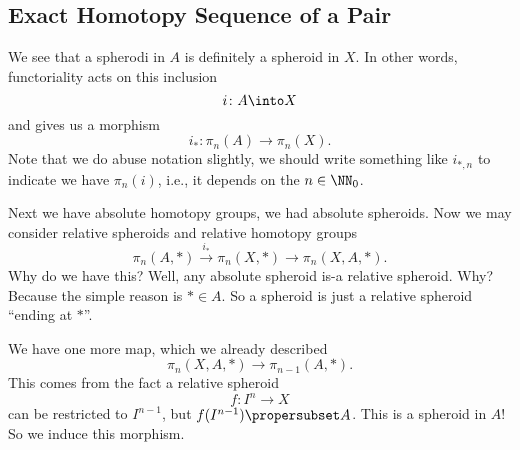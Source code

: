 \subsection{Exact Homotopy Sequence of a Pair}

We see that a spherodi in $A$ is definitely a spheroid in $X$. In
other words, functoriality acts on this inclusion
\begin{equation}
i\colon A\into X
\end{equation}
and gives us a morphism
\begin{equation}
i_{*}\colon\pi_{n}(A)\to\pi_{n}(X).
\end{equation}
Note that we do abuse notation slightly, we should write
something like $i_{*,n}$ to indicate we have $\pi_{n}(i)$, i.e.,
it depends on the $n\in\NN_{0}$.

Next we have absolute homotopy groups, we had absolute spheroids.
Now we may consider relative spheroids and relative homotopy
groups
\begin{equation}
\pi_{n}(A,*)\xrightarrow{i_{*}}\pi_{n}(X,*)\to\pi_{n}(X,A,*).
\end{equation}
Why do we have this? Well, any absolute spheroid is-a relative
spheroid. Why? Because the simple reason is $*\in A$. So a
spheroid is just a relative spheroid ``ending at $*$''.

We have one more map, which we already described
\begin{equation}
\pi_{n}(X,A,*)\to\pi_{n-1}(A,*).
\end{equation}
This comes from the fact a relative spheroid
\begin{equation}
f\colon I^n\to X
\end{equation}
can be restricted to $I^{n-1}$, but $f(I^{n-1})\propersubset
A$. This is a spheroid in $A$! So we induce this morphism.

